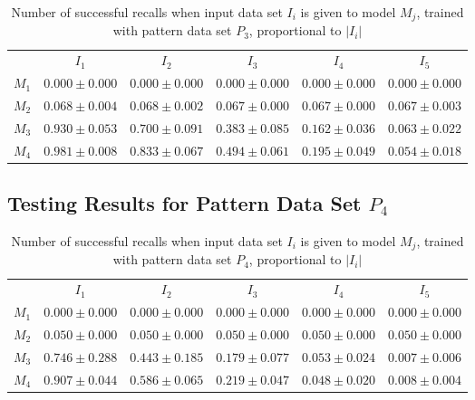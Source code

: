 \documentclass[12pt]{article}
\begin{document}
\begin{appendices}
\begin{table}[H]
\begin{tabular}{cccccc}
 & $I_{1}$  & $I_{2}$  & $I_{3}$  & $I_{4}$  & $I_{5}$ \\ \cline{2-6}
$M_{1}$  & $0.000\pm0.000$  & $0.000\pm0.000$  & $0.000\pm0.000$  & $0.000\pm0.000$  & $0.000\pm0.000$ \\
$M_{2}$  & $0.068\pm0.004$  & $0.068\pm0.002$  & $0.067\pm0.000$  & $0.067\pm0.000$  & $0.067\pm0.003$ \\
$M_{3}$  & $0.930\pm0.053$  & $0.700\pm0.091$  & $0.383\pm0.085$  & $0.162\pm0.036$  & $0.063\pm0.022$ \\
$M_{4}$  & $0.981\pm0.008$  & $0.833\pm0.067$  & $0.494\pm0.061$  & $0.195\pm0.049$  & $0.054\pm0.018$ \\

    \end{tabular}
    \caption{Number of successful recalls when input data set $I_i$ is given to model $M_j$, trained with pattern data set $P_{3}$, proportional to $\left|I_i\right|$}
    \end{table}
    
\subsection{Testing Results for Pattern Data Set $P_{4}$}


    \begin{table}[H]
    \centering
    \def\arraystretch{1.5}
    \footnotesize
    \begin{tabular}{cccccc}
    
 & $I_{1}$  & $I_{2}$  & $I_{3}$  & $I_{4}$  & $I_{5}$ \\ \cline{2-6}
$M_{1}$  & $0.000\pm0.000$  & $0.000\pm0.000$  & $0.000\pm0.000$  & $0.000\pm0.000$  & $0.000\pm0.000$ \\
$M_{2}$  & $0.050\pm0.000$  & $0.050\pm0.000$  & $0.050\pm0.000$  & $0.050\pm0.000$  & $0.050\pm0.000$ \\
$M_{3}$  & $0.746\pm0.288$  & $0.443\pm0.185$  & $0.179\pm0.077$  & $0.053\pm0.024$  & $0.007\pm0.006$ \\
$M_{4}$  & $0.907\pm0.044$  & $0.586\pm0.065$  & $0.219\pm0.047$  & $0.048\pm0.020$  & $0.008\pm0.004$ \\

    \end{tabular}
    \caption{Number of successful recalls when input data set $I_i$ is given to model $M_j$, trained with pattern data set $P_{4}$, proportional to $\left|I_i\right|$}
    \end{table}
    

\end{appendices}
\end{document}
